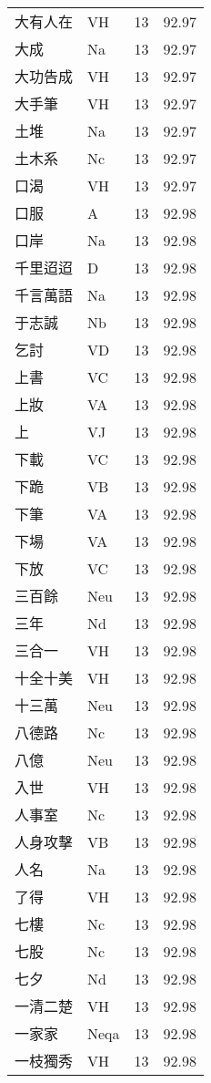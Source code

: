 \documentclass[twocolumn]{book}
\begin{document}
\begin{supertabular}{llrr}
大有人在 & VH & 13 &  92.97\\
大成 & Na & 13 &  92.97\\
大功告成 & VH & 13 &  92.97\\
大手筆 & VH & 13 &  92.97\\
土堆 & Na & 13 &  92.97\\
土木系 & Nc & 13 &  92.97\\
口渴 & VH & 13 &  92.97\\
口服 & A & 13 &  92.98\\
口岸 & Na & 13 &  92.98\\
千里迢迢 & D & 13 &  92.98\\
千言萬語 & Na & 13 &  92.98\\
于志誠 & Nb & 13 &  92.98\\
乞討 & VD & 13 &  92.98\\
上書 & VC & 13 &  92.98\\
上妝 & VA & 13 &  92.98\\
上 & VJ & 13 &  92.98\\
下載 & VC & 13 &  92.98\\
下跪 & VB & 13 &  92.98\\
下筆 & VA & 13 &  92.98\\
下場 & VA & 13 &  92.98\\
下放 & VC & 13 &  92.98\\
三百餘 & Neu & 13 &  92.98\\
三年 & Nd & 13 &  92.98\\
三合一 & VH & 13 &  92.98\\
十全十美 & VH & 13 &  92.98\\
十三萬 & Neu & 13 &  92.98\\
八德路 & Nc & 13 &  92.98\\
八億 & Neu & 13 &  92.98\\
入世 & VH & 13 &  92.98\\
人事室 & Nc & 13 &  92.98\\
人身攻擊 & VB & 13 &  92.98\\
人名 & Na & 13 &  92.98\\
了得 & VH & 13 &  92.98\\
七樓 & Nc & 13 &  92.98\\
七股 & Nc & 13 &  92.98\\
七夕 & Nd & 13 &  92.98\\
一清二楚 & VH & 13 &  92.98\\
一家家 & Neqa & 13 &  92.98\\
一枝獨秀 & VH & 13 &  92.98\\

\end{supertabular}
\end{document}
